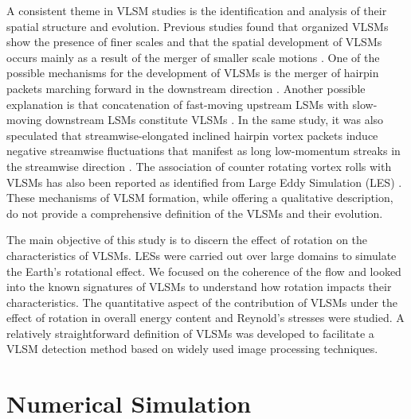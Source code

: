 A consistent theme in VLSM studies is the identification and analysis of their spatial structure and evolution. Previous studies found that organized  VLSMs show the presence of finer scales and that the spatial development of VLSMs occurs mainly as a result of the merger of smaller scale motions \citep{Lee_sung_jfm11,baltzer_jfm_13,lee_sung_jfm_14}. One of the possible mechanisms for the development of VLSMs is the merger of  hairpin packets marching forward in the downstream direction \citep{Lee_sung_jfm11}. Another possible  explanation is that concatenation of fast-moving upstream LSMs with slow-moving downstream LSMs constitute VLSMs \citep{lee_sung_jfm_14}. In the same study, it was also speculated that streamwise-elongated inclined hairpin vortex packets induce negative streamwise fluctuations that manifest as long low-momentum streaks in the streamwise direction \citep{lee_sung_jfm_14}. The association of counter rotating vortex rolls with VLSMs has also been reported as identified from Large Eddy Simulation (LES) \citep{fang2015blm}.  These  mechanisms of VLSM formation, while offering a qualitative description, do not provide a comprehensive definition of the VLSMs and their evolution.
 
The main objective of this study is to discern the effect of rotation on the characteristics of VLSMs.  LESs were carried out over large domains to simulate the Earth's rotational effect.  We focused on the coherence of the flow and looked into the  known  signatures of VLSMs to understand how rotation impacts their characteristics.  The quantitative aspect of the contribution of VLSMs under the effect of rotation  in overall energy content and  Reynold's stresses were studied.  A relatively straightforward  definition of VLSMs was developed to facilitate a VLSM detection method based on widely used image processing techniques. 

\section{Numerical Simulation}
\label{sec:num_sim_chap_1}

